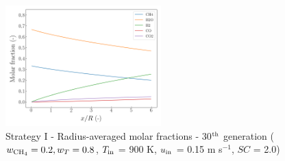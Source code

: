 \documentclass[preprint,12pt]{elsarticle}
\begin{document}
\begin{figure}[h!]
\centering
\includegraphics[width=60mm]{results/5/20C_80T/GEN30-AVG.png}
\caption{\label{fig:5R2080G30-avg} Strategy I - Radius-averaged molar fractions -  30$^{\rm{th}}$ generation ($w_{\rm{CH_4}} = 0.2, w_T = 0.8$, $T_{\rm{in}}$ = 900 K, $u_{\rm{in}}$ = 0.15 m s$^{-1}$, $SC$ = 2.0)}
\end{figure}
\end{document}
